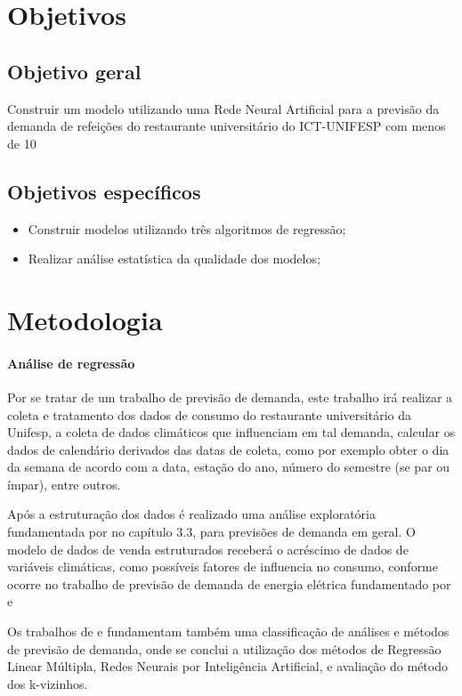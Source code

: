 \documentclass[	12pt, Times, openright, twoside, a4paper, english, brazil]{abntex2}
\begin{document}
\section{Objetivos}
\subsection{Objetivo geral}
Construir um modelo utilizando uma Rede Neural Artificial para a previsão da demanda de
refeições do restaurante universitário do ICT-UNIFESP com menos de 10%
\subsection{Objetivos específicos}
\begin{itemize}
\item Construir modelos utilizando três algoritmos de regressão; 
\item Realizar análise estatística da qualidade dos modelos;
\end{itemize}

\section{Metodologia}
\paragraph*{Análise de regressão}

Por se tratar de um trabalho de previsão de demanda,  este trabalho irá realizar a coleta e tratamento dos dados de consumo do restaurante universitário da Unifesp, a coleta de dados climáticos que influenciam em tal demanda, calcular os dados de calendário derivados das datas de coleta, como por exemplo obter o dia da semana de acordo com a data, estação do ano, número do semestre (se par ou ímpar), entre outros.

Após a estruturação dos dados é realizado uma análise exploratória fundamentada por \cite{Junior2007} no capítulo 3.3, para previsões de demanda em geral.
O modelo de dados de venda estruturados receberá o acréscimo de dados de variáveis climáticas, como possíveis fatores de influencia no consumo, conforme ocorre no trabalho de previsão de demanda de energia elétrica fundamentado por \cite{Almeida2013} \cite{Ruas2012} e \cite{Silva2010}

Os trabalhos de \cite{Junior2007} e \cite{Silva2010} fundamentam também uma classificação de análises e métodos de previsão de demanda, onde se conclui a utilização dos métodos de Regressão Linear Múltipla, Redes Neurais por Inteligência Artificial, e avaliação do método dos k-vizinhos.
\end{document}
